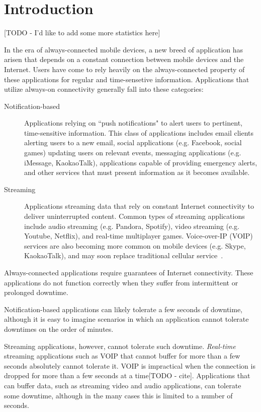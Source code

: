 \section{Introduction}
\label{sec:intro}

[TODO - I'd like to add some more statistics here]

\noindent
In the era of always-connected mobile devices, a new breed of application has arisen that depends on a constant connection between mobile devices and the Internet. Users have come to rely heavily on the always-connected property of these applications for regular and time-sensetive information. Applications that utilize always-on connectivity generally fall into these categories:

\begin{description}
\item[Notification-based] Applications relying on ``push notifications" to alert users to pertinent, time-sensitive information. This class of applications includes email clients alerting users to a new email, social applications (e.g. Facebook, social games) updating users on relevant events, messaging applications (e.g. iMessage, KaokaoTalk), applications capable of providing emergency alerts, and other services that must present information as it becomes available.
\item[Streaming] Applications streaming data that rely on constant Internet connectivity to deliver uninterrupted content. Common types of streaming applications include audio streaming (e.g. Pandora, Spotify), video streaming (e.g. Youtube, Netflix), and real-time multiplayer games. Voice-over-IP (VOIP) services are also becoming more common on mobile devices (e.g. Skype, KaokaoTalk), and may soon replace traditional cellular service~\cite{cellPlans}.
\end{description}

Always-connected applications require guarantees of Internet connectivity. These applications do not function correctly when they suffer from intermittent or prolonged downtime.

Notification-based applications can likely tolerate a few seconds of downtime, although it is easy to imagine scenarios in which an application cannot tolerate downtimes on the order of minutes.

Streaming applications, however, cannot tolerate such downtime. \emph{Real-time} streaming applications such as VOIP that cannot buffer for more than a few seconds absolutely cannot tolerate it. VOIP is impractical when the connection is dropped for more than a few seconds at a time[TODO - cite]. Applications that can buffer data, such as streaming video and audio applications, can tolerate some downtime, although in the many cases this is limited to a number of seconds.

